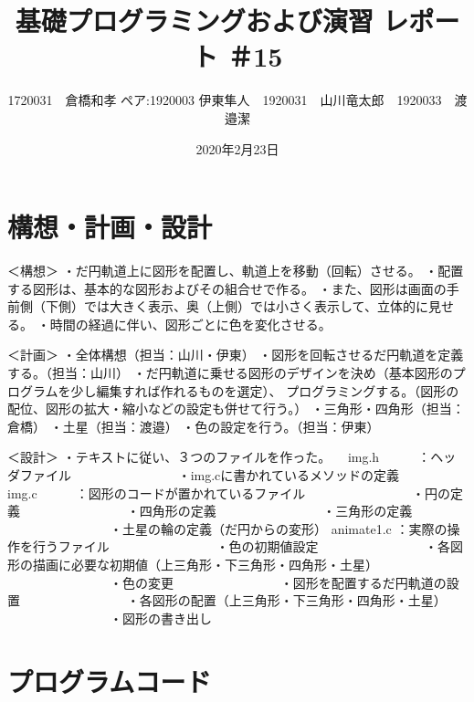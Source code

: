\documentclass[12pt,a4j]{jarticle}
\begin{document}
\title{基礎プログラミングおよび演習 レポート ＃15}
\author{1720031　倉橋和孝 ペア:1920003 伊東隼人　1920031　山川竜太郎　1920033　渡邉潔}
\date{2020年2月23日}
\maketitle

\section{構想・計画・設計}
＜構想＞
・だ円軌道上に図形を配置し、軌道上を移動（回転）させる。
・配置する図形は、基本的な図形およびその組合せで作る。
・また、図形は画面の手前側（下側）では大きく表示、奥（上側）では小さく表示して、立体的に見せる。
・時間の経過に伴い、図形ごとに色を変化させる。

＜計画＞
・全体構想（担当：山川・伊東）
・図形を回転させるだ円軌道を定義する。（担当：山川）
・だ円軌道に乗せる図形のデザインを決め（基本図形のプログラムを少し編集すれば作れるものを選定）、
 プログラミングする。（図形の配位、図形の拡大・縮小などの設定も併せて行う。）
    ・三角形・四角形（担当：倉橋）
    ・土星（担当：渡邉）
・色の設定を行う。（担当：伊東）

＜設計＞
・テキストに従い、３つのファイルを作った。
　img.h　　　：ヘッダファイル
　　　　　　　　・img.cに書かれているメソッドの定義
  img.c　　　：図形のコードが置かれているファイル
　　　　　　　　・円の定義
　　　　　　　　・四角形の定義
　　　　　　　　・三角形の定義
　　　　　　　　・土星の輪の定義（だ円からの変形）
  animate1.c ：実際の操作を行うファイル
　　　　　　　　・色の初期値設定
　　　　　　　　・各図形の描画に必要な初期値（上三角形・下三角形・四角形・土星）
　　　　　　　　・色の変更
　　　　　　　　・図形を配置するだ円軌道の設置
　　　　　　　　・各図形の配置（上三角形・下三角形・四角形・土星）
　　　　　　　　・図形の書き出し

\section{プログラムコード}
\end{document}
